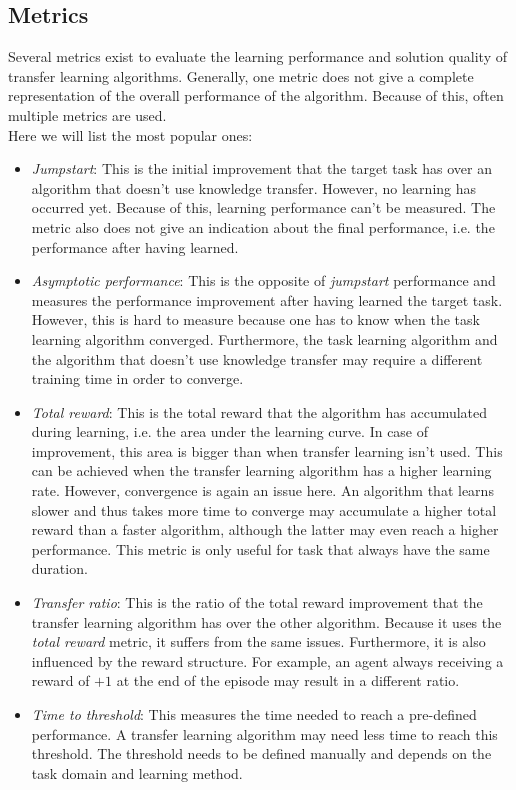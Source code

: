 \documentclass[a4paper, 11pt]{article}
\begin{document}
\subsection{Metrics}
\label{sub:tl_metrics}
Several metrics exist to evaluate the learning performance and solution quality of transfer learning algorithms. Generally, one metric does not give a complete representation of the overall performance of the algorithm. Because of this, often multiple metrics are used.\\
Here we will list the most popular ones:
\begin{itemize}
    \item \textit{Jumpstart}: This is the initial improvement that the target task has over an algorithm that doesn't use knowledge transfer. However, no learning has occurred yet. Because of this, learning performance can't be measured. The metric also does not give an indication about the final performance, i.e. the performance after having learned.
    \item \textit{Asymptotic performance}: This is the opposite of \textit{jumpstart} performance and measures the performance improvement after having learned the target task. However, this is hard to measure because one has to know when the task learning algorithm converged. Furthermore, the task learning algorithm and the algorithm that doesn't use knowledge transfer may require a different training time in order to converge.
    \item \textit{Total reward}: This is the total reward that the algorithm has accumulated during learning, i.e. the area under the learning curve. In case of improvement, this area is bigger than when transfer learning isn't used. This can be achieved when the transfer learning algorithm has a higher learning rate. However, convergence is again an issue here. An algorithm that learns slower and thus takes more time to converge may accumulate a higher total reward than a faster algorithm, although the latter may even reach a higher performance. This metric is only useful for task that always have the same duration.
    \item \textit{Transfer ratio}: This is the ratio of the total reward improvement that the transfer learning algorithm has over the other algorithm. Because it uses the \textit{total reward} metric, it suffers from the same issues. Furthermore, it is also influenced by the reward structure. For example, an agent always receiving a reward of $+1$ at the end of the episode may result in a different ratio.
    \item \textit{Time to threshold}: This measures the time needed to reach a pre-defined performance. A transfer learning algorithm may need less time to reach this threshold. The threshold needs to be defined manually and depends on the task domain and learning method.
\end{itemize}
\end{document}
